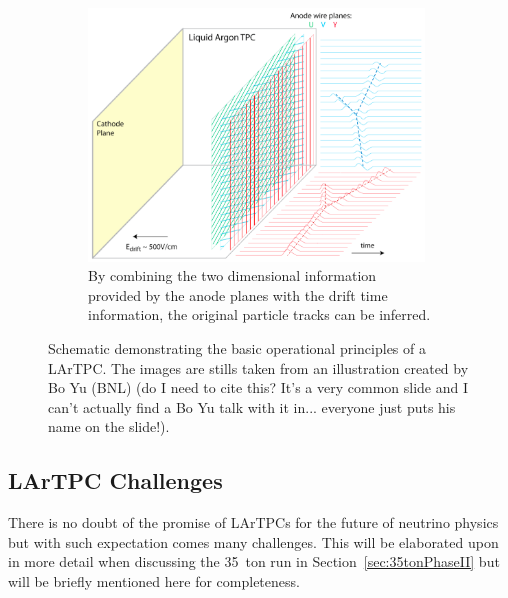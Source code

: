 \begin{figure}[p]
\begin{subfigure}[t]{0.48\linewidth}
    \label{fig:LArTPCOperation3}
  \end{subfigure}
  \hfill
  \begin{subfigure}[t]{0.48\linewidth}
    \centering
    \includegraphics[width=0.98\textwidth]{LArTPCOperation4.png}
    \caption{By combining the two dimensional information provided by the anode planes with the drift time information, the original particle tracks can be inferred.}
    \label{fig:LArTPCOperation4}
  \end{subfigure}
  \caption[Schematic demonstrating the basic operational principles of a LArTPC.]{Schematic demonstrating the basic operational principles of a LArTPC.  The images are stills taken from an illustration created by Bo Yu (BNL) {\color{red}(do I need to cite this?  It's a very common slide and I can't actually find a Bo Yu talk with it in... everyone just puts his name on the slide!)}.}
  \label{fig:LArTPCOperation}
\end{figure}

\subsection{LArTPC Challenges}\label{sec:LArTPCChallenges}

There is no doubt of the promise of LArTPCs for the future of neutrino physics but with such expectation comes many challenges.  This will be elaborated upon in more detail when discussing the 35~ton run in Section~\ref{sec:35tonPhaseII} but will be briefly mentioned here for completeness.

